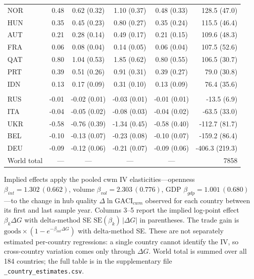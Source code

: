 \begin{table}[t]
\begin{threeparttable}
\begin{tabular}{lrcccr}
NOR & 0.48 & 0.62 (0.32) & 1.10 (0.37) & 0.48 (0.33) & 128.5 (47.0) \\
HUN & 0.35 & 0.45 (0.23) & 0.80 (0.27) & 0.35 (0.24) & 115.5 (46.4) \\
AUT & 0.21 & 0.28 (0.14) & 0.49 (0.17) & 0.21 (0.15) & 109.6 (48.3) \\
FRA & 0.06 & 0.08 (0.04) & 0.14 (0.05) & 0.06 (0.04) & 107.5 (52.6) \\
QAT & 0.80 & 1.04 (0.53) & 1.85 (0.62) & 0.80 (0.55) & 106.5 (30.7) \\
PRT & 0.39 & 0.51 (0.26) & 0.91 (0.31) & 0.39 (0.27) & 79.0 (30.8) \\
IDN & 0.13 & 0.17 (0.09) & 0.31 (0.10) & 0.13 (0.09) & 76.4 (35.6) \\
\addlinespace
\multicolumn{6}{l}{\emph{Connectivity decliners (bottom 5)}}\\
RUS & -0.01 & -0.02 (0.01) & -0.03 (0.01) & -0.01 (0.01) & -13.5 (6.9) \\
ITA & -0.04 & -0.05 (0.02) & -0.08 (0.03) & -0.04 (0.02) & -63.5 (33.0) \\
UKR & -0.58 & -0.76 (0.39) & -1.34 (0.45) & -0.58 (0.40) & -112.7 (81.7) \\
BEL & -0.10 & -0.13 (0.07) & -0.23 (0.08) & -0.10 (0.07) & -159.2 (86.4) \\
DEU & -0.09 & -0.12 (0.06) & -0.21 (0.07) & -0.09 (0.06) & -406.3 (219.3) \\
\midrule
World total & --- & --- & --- & --- & 7858 \\
\bottomrule
\end{tabular}
\begin{tablenotes}\scriptsize
\item Implied effects apply the pooled cwm IV elasticities---openness $\beta_{int}=1.302\,(0.662)$, volume $\beta_{vol}=2.303\,(0.776)$, GDP $\beta_{gdp}=1.001\,(0.680)$---to the change in hub quality $\Delta\ln\mathrm{GACI}_{cwm}$ observed for each country between its first and last sample year. Columns 3--5 report the implied log-point effect $\beta_k\Delta G$ with delta-method SE $\mathrm{SE}(\beta_k)\,|\Delta G|$ in parentheses. The trade gain is $\text{goods}\times(1-e^{-\beta_{int}\Delta G})$ with delta-method SE. These are not separately estimated per-country regressions: a single country cannot identify the IV, so cross-country variation comes only through $\Delta G$. World total is summed over all 184 countries; the full table is in the supplementary file \texttt{\_country\_estimates.csv}.
\end{tablenotes}
\end{threeparttable}
\end{table}
